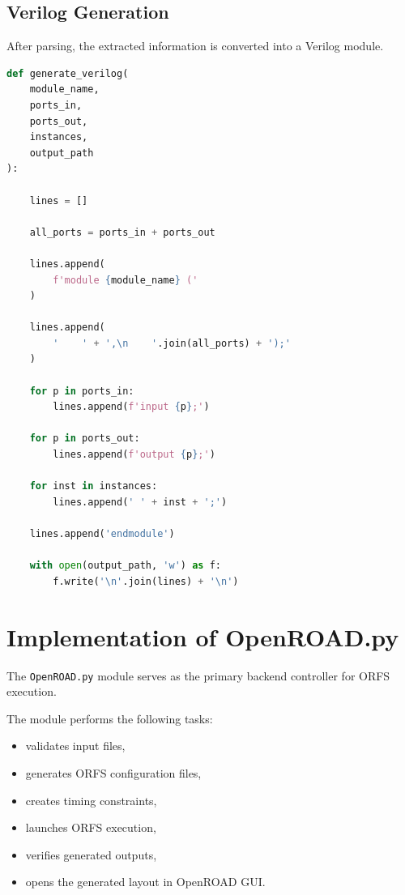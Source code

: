 \subsection{Verilog Generation}

After parsing, the extracted information is converted into a Verilog module.

\begin{lstlisting}[language=python,
caption={Verilog generation in netlist2rtl.py.}]
def generate_verilog(
    module_name,
    ports_in,
    ports_out,
    instances,
    output_path
):

    lines = []

    all_ports = ports_in + ports_out

    lines.append(
        f'module {module_name} ('
    )

    lines.append(
        '    ' + ',\n    '.join(all_ports) + ');'
    )

    for p in ports_in:
        lines.append(f'input {p};')

    for p in ports_out:
        lines.append(f'output {p};')

    for inst in instances:
        lines.append(' ' + inst + ';')

    lines.append('endmodule')

    with open(output_path, 'w') as f:
        f.write('\n'.join(lines) + '\n')
\end{lstlisting}

\section{Implementation of OpenROAD.py}

The \texttt{OpenROAD.py} module serves as the primary backend controller for ORFS execution.

The module performs the following tasks:

\begin{itemize}
    \item validates input files,
    \item generates ORFS configuration files,
    \item creates timing constraints,
    \item launches ORFS execution,
    \item verifies generated outputs,
    \item opens the generated layout in OpenROAD GUI.
\end{itemize}

